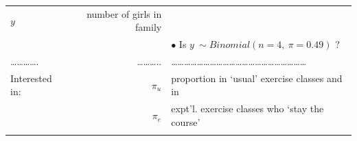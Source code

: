 \documentclass[]{book}
\begin{document}
\begin{longtable}[]{@{}lrl@{}}
\begin{minipage}[t]{0.16\columnwidth}
\(y\)\strut
\end{minipage} & \begin{minipage}[t]{0.16\columnwidth}\raggedright
number of girls in family\strut
\end{minipage}\tabularnewline
\begin{minipage}[t]{0.60\columnwidth}\raggedright
\strut
\end{minipage} & \begin{minipage}[t]{0.16\columnwidth}\raggedleft
\strut
\end{minipage} & \begin{minipage}[t]{0.16\columnwidth}\raggedright
\(\bullet\) Is \(y ~ \sim Binomial(n=4, \ \pi=0.49)\) ?\strut
\end{minipage}\tabularnewline
\begin{minipage}[t]{0.60\columnwidth}\raggedright
\ldots{}\ldots{}\ldots{}\ldots{}.\strut
\end{minipage} & \begin{minipage}[t]{0.16\columnwidth}\raggedleft
\ldots{}\ldots{}\ldots{}..\strut
\end{minipage} & \begin{minipage}[t]{0.16\columnwidth}\raggedright
\ldots{}\ldots{}\ldots{}\ldots{}\ldots{}\ldots{}\ldots{}\ldots{}\ldots{}\ldots{}\ldots{}\ldots{}\ldots{}\ldots{}\ldots{}\ldots{}\ldots{}\ldots{}\ldots{}\ldots{}\ldots{}\strut
\end{minipage}\tabularnewline
\begin{minipage}[t]{0.60\columnwidth}\raggedright
Interested in:\strut
\end{minipage} & \begin{minipage}[t]{0.16\columnwidth}\raggedleft
\(\pi_u\)\strut
\end{minipage} & \begin{minipage}[t]{0.16\columnwidth}\raggedright
proportion in `usual' exercise classes and in\strut
\end{minipage}\tabularnewline
\begin{minipage}[t]{0.60\columnwidth}\raggedright
\strut
\end{minipage} & \begin{minipage}[t]{0.16\columnwidth}\raggedleft
\(\pi_e\)\strut
\end{minipage} & \begin{minipage}[t]{0.16\columnwidth}\raggedright
expt'l. exercise classes who `stay the course'\strut
\end{minipage}\tabularnewline
\begin{minipage}[t]{0.60\columnwidth}\raggedright

\end{minipage}
\end{longtable}
\end{document}
